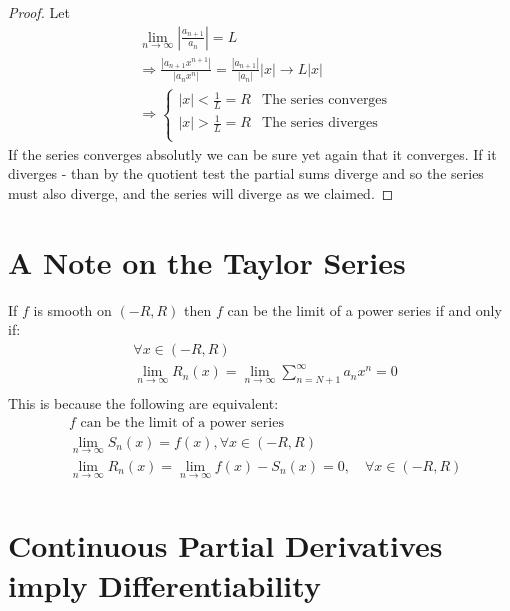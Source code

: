 \documentclass[11pt,a4paper]{article}
\theoremstyle{definition}
\theoremstyle{plain}
\begin{document}
  \begin{proof}
    Let
    \begin{align*}
      &\lim_{n\to\infty}{\left|\frac{a_{n+1}}{a_n}\right|} = L \\
      &\Rightarrow
      \frac{|a_{n+1}x^{n+1}|}{|a_nx^n|} = 
      \frac{|a_{n+1}|}{|a_n|}|x|\to L|x| \\
      &\Rightarrow
      \begin{cases}
      |x|<\frac{1}{L} = R & \text{The series converges} \\
      |x|>\frac{1}{L} = R & \text{The series diverges} \\
      \end{cases}
    \end{align*}
    If the series converges absolutly we can be sure yet again that it converges. 
    If it diverges - than by the quotient test the partial sums 
    diverge and so the series must also diverge, 
    and the series will diverge as we claimed.
  \end{proof}

	\newpage
	
	\section{A Note on the Taylor Series}
	If $f$ is smooth on $(-R,R)$ then $f$ can be the limit of a power series 
  if and only if:
	\begin{align*}
		&\forall x\in(-R,R) \\
		&\lim_{n\to\infty}{R_n(x) = 
		 \lim_{n\to\infty}{\sum_{n=N+1}^\infty}{a_nx^n} = 0} \\
	\end{align*}
	This is because the following are equivalent:
	\begin{align*}
	    &\text{$f$ can be the limit of a power series} \\
		&\lim_{n\to\infty}{S_n(x)=f(x), \forall x\in(-R,R)} \\
		&\lim_{n\to\infty}{R_n(x)} = 
		\lim_{n\to\infty}{f(x)-S_n(x)=0, \quad \forall x\in(-R,R)} \\
	\end{align*}

	\newpage
	
	\section{Continuous Partial Derivatives imply Differentiability}
\end{document}
